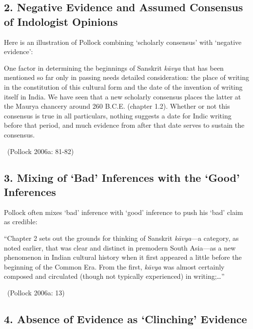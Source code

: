 \subsection*{2. Negative Evidence and  Assumed Consensus of Indologist Opinions}

Here is an illustration of Pollock combining ‘scholarly consensus’ with ‘negative evidence’:

\begin{myquote}
One factor in determining the beginnings of Sanskrit \textit{kāvya} that has been mentioned so far only in passing needs detailed consideration: the place of writing in the constitution of this cultural form and the date of the invention of writing itself in India. We have seen that a new scholarly consensus places the latter at the Maurya chancery around 260 B.C.E. (chapter 1.2). Whether or not this consensus is true in all particulars, nothing suggests a date for Indic writing before that period, and much evidence from after that date serves to sustain the consensus. 

~\hfill (Pollock 2006a: 81-82)
\end{myquote}

\vspace{-.3cm}

\subsection*{3. Mixing of ‘Bad’ Inferences with the ‘Good’ Inferences}

Pollock often mixes ‘bad’ inference with ‘good’ inference to push his ‘bad’ claim as credible:

\begin{myquote}
“Chapter 2 sets out the grounds for thinking of Sanskrit \textit{kāvya}—a category, as noted earlier, that was clear and distinct in premodern South Asia—as a new phenomenon in Indian cultural history when it ﬁrst appeared a little before the beginning of the Common Era. From the ﬁrst, \textit{kāvya} was almost certainly composed and circulated (though not typically experienced) in writing;…” 

~\hfill (Pollock 2006a: 13)
\end{myquote}

\vspace{-.3cm}

\subsection*{4. Absence of Evidence as ‘Clinching’ Evidence}

